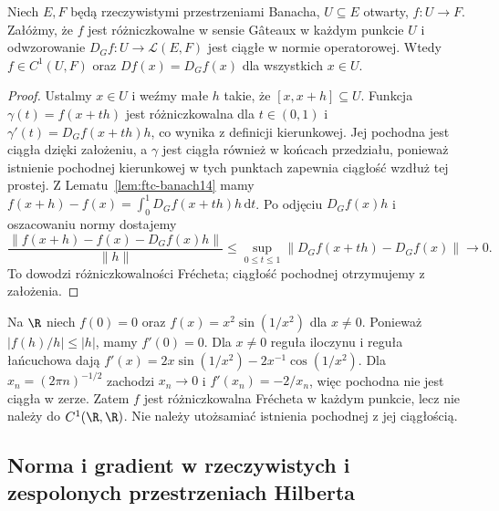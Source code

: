 \begin{twierdzenie}
\label{thm:continuous-gateaux14}
Niech $E,F$ będą rzeczywistymi przestrzeniami Banacha, $U\subseteq E$ otwarty, $f:U\to F$. Załóżmy, że $f$ jest różniczkowalne w sensie Gâteaux w każdym punkcie $U$ i odwzorowanie $D_Gf:U\to\mathcal L(E,F)$ jest ciągłe w normie operatorowej. Wtedy $f\in C^1(U,F)$ oraz $Df(x)=D_Gf(x)$ dla wszystkich $x\in U$.
\end{twierdzenie}
\begin{proof}
Ustalmy $x\in U$ i weźmy małe $h$ takie, że $[x,x+h]\subseteq U$. Funkcja $\gamma(t)=f(x+th)$ jest różniczkowalna dla $t\in(0,1)$ i $\gamma'(t)=D_Gf(x+th)h$, co wynika z definicji kierunkowej. Jej pochodna jest ciągła dzięki założeniu, a $\gamma$ jest ciągła również w końcach przedziału, ponieważ istnienie pochodnej kierunkowej w tych punktach zapewnia ciągłość wzdłuż tej prostej. Z Lematu~\ref{lem:ftc-banach14} mamy
$f(x+h)-f(x)=\int_0^1 D_Gf(x+th)h\,\mathrm dt$.
Po odjęciu $D_Gf(x)h$ i oszacowaniu normy dostajemy
\[
\frac{\|f(x+h)-f(x)-D_Gf(x)h\|}{\|h\|}
\le\sup_{0\le t\le1}\|D_Gf(x+th)-D_Gf(x)\|\longrightarrow0.
\]
To dowodzi różniczkowalności Frécheta; ciągłość pochodnej otrzymujemy z założenia.
\end{proof}

\begin{przyklad}
\label{ex:derivative-noncontinuous14}
Na $\R$ niech $f(0)=0$ oraz $f(x)=x^2\sin(1/x^2)$ dla $x\ne0$. Ponieważ $|f(h)/h|\le|h|$, mamy $f'(0)=0$. Dla $x\ne0$ reguła iloczynu i reguła łańcuchowa dają $f'(x)=2x\sin(1/x^2)-2x^{-1}\cos(1/x^2)$. Dla $x_n=(2\pi n)^{-1/2}$ zachodzi $x_n\to0$ i $f'(x_n)=-2/x_n$, więc pochodna nie jest ciągła w zerze. Zatem $f$ jest różniczkowalna Frécheta w każdym punkcie, lecz nie należy do $C^1(\R,\R)$. Nie należy utożsamiać istnienia pochodnej z jej ciągłością.
\end{przyklad}

\subsection{Norma i gradient w rzeczywistych i zespolonych przestrzeniach Hilberta}

